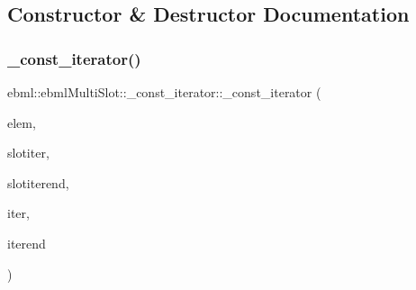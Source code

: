 \subsection{Constructor \& Destructor Documentation}
\mbox{\label{classebml_1_1ebmlMultiSlot_1_1__const__iterator_a5b4e23f10ca68b3ada0101d6a085f48d}} 
\subsubsection{\texorpdfstring{\+\_\+const\+\_\+iterator()}{\_const\_iterator()}\hspace{0.1cm}{\footnotesize\ttfamily [1/3]}}
{\footnotesize\ttfamily ebml\+::ebml\+Multi\+Slot\+::\+\_\+const\+\_\+iterator\+::\+\_\+const\+\_\+iterator (\begin{DoxyParamCaption}\item[{const \mbox{\hyperlink{namespaceebml_a2deef4e8071531b32e3533f1bf978917}{c\+\_\+ebml\+Element\+\_\+sp}} \&}]{elem,  }\item[{const std\+::vector$<$ \+\_\+slot\+\_\+t $>$\+::\mbox{\hyperlink{classebml_1_1ebmlMasterElement_1_1const__iterator}{const\+\_\+iterator}} \&}]{slotiter,  }\item[{const std\+::vector$<$ \+\_\+slot\+\_\+t $>$\+::\mbox{\hyperlink{classebml_1_1ebmlMasterElement_1_1const__iterator}{const\+\_\+iterator}} \&}]{slotiterend,  }\item[{const \mbox{\hyperlink{classebml_1_1const__slot__t_1_1iterator}{const\+\_\+slot\+\_\+t\+::iterator}} \&}]{iter,  }\item[{const \mbox{\hyperlink{classebml_1_1const__slot__t_1_1iterator}{const\+\_\+slot\+\_\+t\+::iterator}} \&}]{iterend }\end{DoxyParamCaption})\hspace{0.3cm}{\ttfamily [protected]}}

\mbox{\label{classebml_1_1ebmlMultiSlot_1_1__const__iterator_a681e9596c1ae982f3c482548cb16333d}} 
